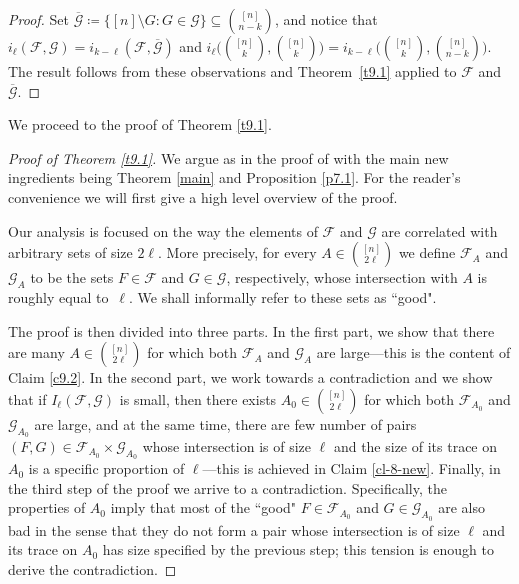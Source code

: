 \documentclass[10pt]{amsart}
\theoremstyle{remark}
\newcommand{\Fcal}{\mathcal{F}}
\newcommand{\Gcal}{\mathcal{G}}
\begin{document}
\begin{proof}
Set $\overline{\Gcal}\coloneqq \big\{[n]\setminus G: G\in \Gcal\big\}\subseteq \binom{[n]}{n-k}$,
and notice that $i_{\ell}(\Fcal,\Gcal)=i_{k-\ell}(\Fcal,\overline{\Gcal})$ and
$i_{\ell}\big(\binom{[n]}{k},\binom{[n]}{k}\big)=i_{k-\ell}\big(\binom{[n]}{k},\binom{[n]}{n-k}\big)$.
The result follows from these observations and Theorem~\ref{t9.1} applied to $\Fcal$ and $\overline{\Gcal}$.
\end{proof}
We proceed to the proof of Theorem \ref{t9.1}.
\begin{proof}[Proof of Theorem \emph{\ref{t9.1}}]
We argue as in the proof of \cite[Theorem 1.14]{FR87} with the main new ingredients being
Theorem \ref{main} and Proposition \ref{p7.1}. For the reader's convenience we will first give a high level overview of the proof.

Our analysis is focused on the way the elements of $\Fcal$ and $\Gcal$ are correlated with arbitrary sets of size $2\ell$.
More precisely, for every $A\in\binom{[n]}{2\ell}$ we define $\Fcal_A$ and $\Gcal_A$ to be the sets $F\in \Fcal$
and $G\in \Gcal$, respectively, whose intersection with $A$ is roughly equal to~$\ell$.
We shall informally refer to these sets as ``good"\!.

The proof is then divided into three parts. In the first part, we show that there are many $A\in\binom{[n]}{2\ell}$ for which
both $\Fcal_A$ and $\Gcal_A$ are large---this is the content of Claim \ref{c9.2}. In the second part, we work towards
a contradiction  and we show that if $I_{\ell}(\Fcal,\Gcal)$ is small, then there exists $A_0\in\binom{[n]}{2\ell}$ for which
both $\Fcal_{A_0}$ and $\Gcal_{A_0}$ are large, and at the same time, there are few number of pairs $(F,G)\in\Fcal_{A_0}\times\Gcal_{A_0}$ whose intersection is of size $\ell$ and the size of its trace on $A_0$
is a specific proportion of $\ell$---this is achieved in Claim \ref{cl-8-new}.
Finally, in the third step of the proof we arrive to a contradiction. Specifically, the properties of $A_0$ imply that most of the ``good" $F\in \Fcal_{A_0}$ and $G\in \Gcal_{A_0}$ are also bad in the sense that they do not form a pair whose  intersection is of size $\ell$ and its trace on $A_0$ has size specified by the previous step; this tension is enough to derive
the contradiction.


\end{proof}
\end{document}
